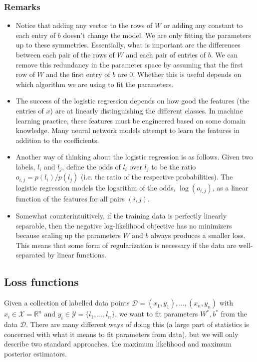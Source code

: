 \subsubsection{Remarks}
\begin{itemize}
 \item Notice that adding any vector to the rows of $W$ or adding any constant to each entry of $b$ doesn't
 change the model. We are only fitting the parameters up to these symmetries. Essentially, what is important are the
 differences between each pair of the rows of $W$ and each pair of entries of $b$. We can remove this redundancy in 
 the parameter space by assuming that the first row of $W$ and the first entry of $b$ are $0$. Whether this is
 useful depends on which algorithm we are using to fit the parameters.
 \item The success of the logistic regression depends on how good the features (the entries of $x$) are at linearly distinguishing
 the different classes. In machine learning practice, these features must be engineered based on some domain knowledge.
 Many neural network models attempt to learn the features in addition to the coefficients.
 \item Another way of thinking about the logistic regression is as follows. Given two labels, $l_i$ and $l_j$, define the
 odds of $l_i$ over $l_j$ to be the ratio $o_{i,j} = p(l_i) / p(l_j)$ (i.e. the ratio of the respective probabilities). 
 The logistic regression models the logarithm of the
 odds, $\log(o_{i,j})$, as a linear function of the features for all pairs $(i,j)$.
 \item Somewhat counterintuitively, if the training data is perfectly linearly separable, then the negative log-likelihood
 objective has no minimizers because scaling up the parameters $W$ and $b$ always produces a smaller loss. This means that
 some form of regularization is necessary if the data are well-separated by linear functions.
\end{itemize}


\subsection{Loss functions}
Given a collection of labelled data points $\mathcal{D} = (x_1,y_1),...,(x_n,y_n)$ with $x_i\in \mathcal{X} = \mathbb{R}^n$ and
$y_i \in \mathcal{Y} = \{l_1,...,l_n\}$, we want to fit parameters $W^*,b^*$ from the data $\mathcal{D}$. There are
many different ways of doing this (a large part of statistics is concerned with what it means to fit parameters from data),
but we will only describe two standard approaches, the maximum likelihood and maximum posterior estimators.
